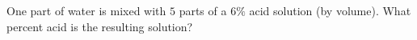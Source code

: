 One part of water is mixed with $5$ parts of a $6\%$ acid solution (by volume). What percent acid is the resulting solution?
